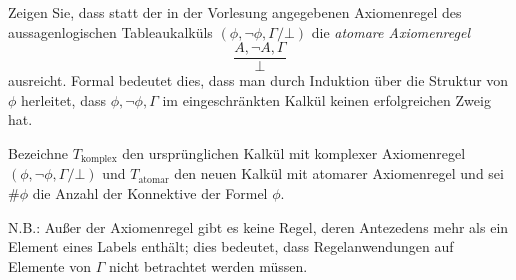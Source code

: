 \newcommand{\Tk}{T_\text{komplex}}
\newcommand{\Ta}{T_\text{atomar}}

\begin{center}
\colorbox{Golden}{\begin{minipage}{0.95\textwidth}%
Zeigen Sie, dass statt der in der Vorlesung angegebenen Axiomenregel des aussagenlogischen Tableaukalküls
$(\phi,\neg\phi,\Gamma/\bot)$ die \emph{atomare Axiomenregel}
\[
  \frac{A,\neg A,\Gamma}{\bot}
\]
ausreicht. Formal bedeutet dies, dass man durch Induktion über die Struktur von $\phi$ herleitet, dass
$ \phi,\neg\phi,\Gamma$ im eingeschränkten Kalkül keinen erfolgreichen Zweig hat.
\end{minipage}}
\end{center}
\vspace{0.5cm}

Bezeichne $\Tk$ den ursprünglichen Kalkül mit komplexer Axiomenregel $(\phi, \neg \phi, \Gamma / \bot)$ und $\Ta$ den
neuen Kalkül mit atomarer Axiomenregel und sei $\#\phi$ die Anzahl der Konnektive der Formel $\phi$.

N.B.: Außer der Axiomenregel gibt es keine Regel, deren Antezedens mehr als ein Element eines Labels enthält; dies
bedeutet, dass Regelanwendungen auf Elemente von $\Gamma$ nicht betrachtet werden müssen.

